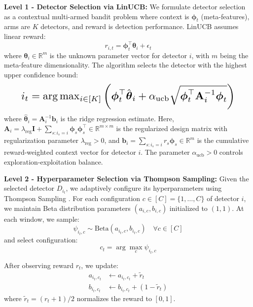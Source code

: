 \documentclass{article}
\begin{document}
\textbf{Level 1 - Detector Selection via LinUCB:} We formulate detector selection as a contextual multi-armed bandit problem where context is $\boldsymbol{\phi}_t$ (meta-features), arms are $K$ detectors, and reward is detection performance. LinUCB \cite{Li2010LinUCB} assumes linear reward:
\begin{equation}
r_{i,t} = \boldsymbol{\phi}_t^\top \boldsymbol{\theta}_i + \epsilon_t
\end{equation}
where $\boldsymbol{\theta}_i \in \mathbb{R}^m$ is the unknown parameter vector for detector $i$, with $m$ being the meta-feature dimensionality. The algorithm selects the detector with the highest upper confidence bound:
\begin{equation}
\resizebox{0.9\columnwidth}{!}{$
i_t = \arg\max_{i \in [K]} \left( \boldsymbol{\phi}_t^\top \hat{\boldsymbol{\theta}}_i + \alpha_{\text{ucb}} \sqrt{\boldsymbol{\phi}_t^\top \mathbf{A}_i^{-1} \boldsymbol{\phi}_t} \right)
$}
\end{equation}
where $\hat{\boldsymbol{\theta}}_i = \mathbf{A}_i^{-1} \mathbf{b}_i$ is the ridge regression estimate. Here, $\mathbf{A}_i = \lambda_{\text{reg}}\mathbf{I} + \sum_{s:i_s=i} \boldsymbol{\phi}_s \boldsymbol{\phi}_s^\top \in \mathbb{R}^{m \times m}$ is the regularized design matrix with regularization parameter $\lambda_{\text{reg}} > 0$, and $\mathbf{b}_i = \sum_{s:i_s=i} r_s \boldsymbol{\phi}_s \in \mathbb{R}^m$ is the cumulative reward-weighted context vector for detector $i$. The parameter $\alpha_{\text{ucb}} > 0$ controls exploration-exploitation balance.

\textbf{Level 2 - Hyperparameter Selection via Thompson Sampling:} Given the selected detector $D_{i_t}$, we adaptively configure its hyperparameters using Thompson Sampling \cite{Agrawal2012Thompson}. For each configuration $c \in [C] = \{1, \ldots, C\}$ of detector $i$, we maintain Beta distribution parameters $(a_{i,c}, b_{i,c})$ initialized to $(1, 1)$. At each window, we sample:
\begin{equation}
\label{eq:ts_sample}
\psi_{i_t,c} \sim \text{Beta}(a_{i_t,c}, b_{i_t,c}) \quad \forall c \in [C]
\end{equation}
and select configuration:
\begin{equation}
\label{eq:ts_select}
c_t = \arg\max_c \psi_{i_t,c}
\end{equation}

After observing reward $r_t$, we update:
\begin{align}
\label{eq:ts_update}
a_{i_t,c_t} &\gets a_{i_t,c_t} + \tilde{r}_t \\
b_{i_t,c_t} &\gets b_{i_t,c_t} + (1 - \tilde{r}_t)
\end{align}
where $\tilde{r}_t = (r_t + 1)/2$ normalizes the reward to $[0,1]$. %
\end{document}
